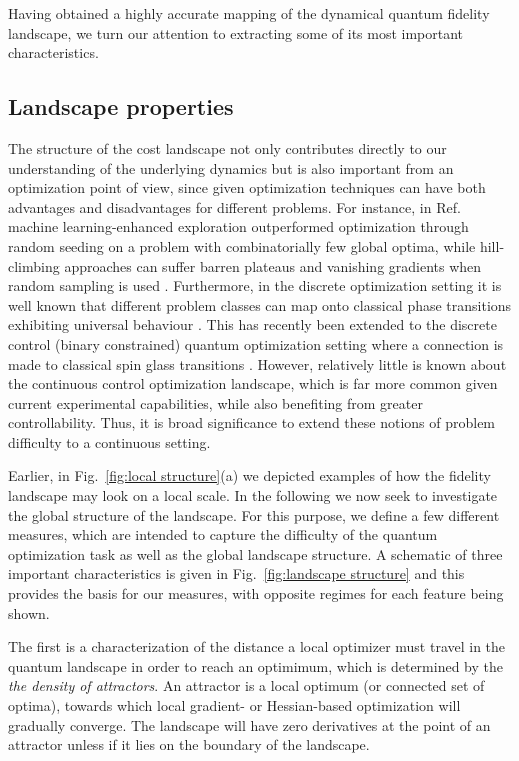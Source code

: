 \documentclass[aps, twocolumn,superscriptaddress]{revtex4-1}
\begin{document}
Having obtained a highly accurate mapping of the dynamical quantum fidelity landscape, we turn our attention to extracting some of its most important characteristics.  

\subsection{Landscape properties} \label{sec:landscape_characteristics}

The structure of the cost landscape not only contributes directly to our understanding of the underlying dynamics but is also important from an optimization point of view, since given optimization techniques can have both advantages and disadvantages for different problems. For instance, in Ref.~\cite{dalgaard2020global} machine learning-enhanced exploration outperformed optimization through random seeding on a problem with combinatorially few global optima, while hill-climbing approaches can suffer barren plateaus and vanishing gradients when random sampling is used \cite{mcclean2018barren}.  Furthermore, in the discrete optimization setting it is well known that different problem classes can map onto classical phase transitions exhibiting universal behaviour \cite{smith1996locating,xu2000exact,gent1996tsp}.  This has recently been extended to the discrete control (binary constrained) quantum optimization setting where a connection is made to classical spin glass transitions \cite{bukov2018reinforcement,day2019glassy}.  However, relatively little is known about the continuous control optimization landscape, which is far more common given current experimental capabilities, while also benefiting from greater controllability.  Thus, it is broad significance to extend these notions of problem difficulty to a continuous setting.

Earlier, in Fig.~\ref{fig:local structure}(a) we depicted examples of how the fidelity landscape may look on a local scale. In the following we now seek to investigate the global structure of the landscape. For this purpose, we define a few different measures, which are intended to capture the difficulty of the quantum optimization task as well as the global landscape structure. A schematic of three important characteristics is given in Fig.~\ref{fig:landscape structure} and this provides the basis for our measures, with opposite regimes for each feature being shown.  

The first is a characterization of the distance a local optimizer must travel in the quantum landscape in order to reach an optimimum, which is determined by the \emph{the density of attractors}. An attractor is a local optimum (or connected set of optima), towards which local gradient- or Hessian-based optimization will gradually converge. The landscape will have zero derivatives at the point of an attractor unless if it lies on the boundary of the landscape. 
\end{document}
